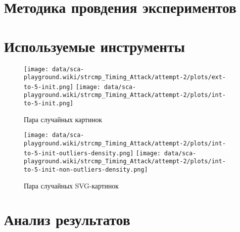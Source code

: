 \section{Методика провдения экспериментов}

\clearpage

\section{Используемые инструменты}

\begin{figure}[H]
    \texttt{[image: data/sca-playground.wiki/strcmp\_Timing\_Attack/attempt-2/plots/ext-to-5-init.png]}
    \texttt{[image: data/sca-playground.wiki/strcmp\_Timing\_Attack/attempt-2/plots/int-to-5-init.png]} \label{length_entropy}
    \caption{Пара случайных картинок}
\end{figure}

\begin{figure}[H]
    \texttt{[image: data/sca-playground.wiki/strcmp\_Timing\_Attack/attempt-2/plots/int-to-5-init-outliers-density.png]}
    \texttt{[image: data/sca-playground.wiki/strcmp\_Timing\_Attack/attempt-2/plots/int-to-5-init-non-outliers-density.png]} \label{length_entropy}
    \caption{Пара случайных SVG-картинок}
\end{figure}

\clearpage

\section{Анализ результатов}

\clearpage
